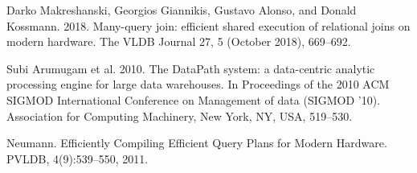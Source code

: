 \documentclass{beamer}
\begin{document}
\begin{frame}[allowframebreaks]
{\begin{thebibliography}{99}
 Darko Makreshanski, Georgios Giannikis, Gustavo Alonso, and Donald Kossmann. 2018. Many-query join: efficient shared execution of relational joins on modern hardware. The VLDB Journal 27, 5 (October   2018), 669–692.

 Subi Arumugam et al. 2010. The DataPath system: a data-centric analytic processing engine for large data warehouses. In Proceedings of the 2010 ACM SIGMOD International Conference on Management of data (SIGMOD ’10). Association for Computing Machinery, New York, NY, USA, 519–530.

 Neumann. Efficiently Compiling Efficient Query Plans for Modern Hardware. PVLDB, 4(9):539–550, 2011.


\end{thebibliography}
}
\end{frame}
\end{document}

